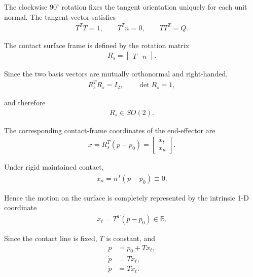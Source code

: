 \documentclass[10pt,journal,letterpaper]{IEEEtran}
\begin{document}
The clockwise $90^\circ$ rotation fixes the tangent orientation uniquely for each unit normal. The tangent vector satisfies
\begin{equation}\label{eq:tangent-identities}
\begin{aligned}
T^TT=1,\qquad T^Tn=0,\qquad TT^T=Q.
\end{aligned}
\end{equation}

The contact surface frame is defined by the rotation matrix
\begin{equation}\label{eq:contact-frame}
\begin{aligned}
R_{s}
=
\begin{bmatrix}
T & n
\end{bmatrix}.
\end{aligned}
\end{equation}

Since the two basis vectors are mutually orthonormal and right-handed,
\begin{align*}
R_{s}^{T}R_{s}=I_2,
\qquad
\det R_{s}=1,
\end{align*}

and therefore
\begin{align*}
R_{s}\in SO(2).
\end{align*}

The corresponding contact-frame coordinates of the end-effector are
\begin{align*}
x
=
R_{s}^{T}(p-p_{0})
=
\begin{bmatrix}
x_{t} \\
x_{n}
\end{bmatrix}.
\end{align*}

Under rigid maintained contact,
\begin{align*}
x_{n}
=
n^{T}(p-p_{0})
\equiv 0.
\end{align*}

Hence the motion on the surface is completely represented by the intrinsic 1-D coordinate
\begin{equation}\label{eq:intrinsic-position}
\begin{aligned}
x_{t} = T^{T}(p-p_{0}) \in\mathbb{R}.
\end{aligned}
\end{equation}

Since the contact line is fixed, $T$ is constant, and
\begin{equation}\label{eq:contact-motion}
\begin{aligned}
p&=p_0+Tx_{t},\\
\dot p&=T\dot x_{t},\\
\ddot p&=T\ddot x_{t}.
\end{aligned}
\end{equation}
\end{document}
